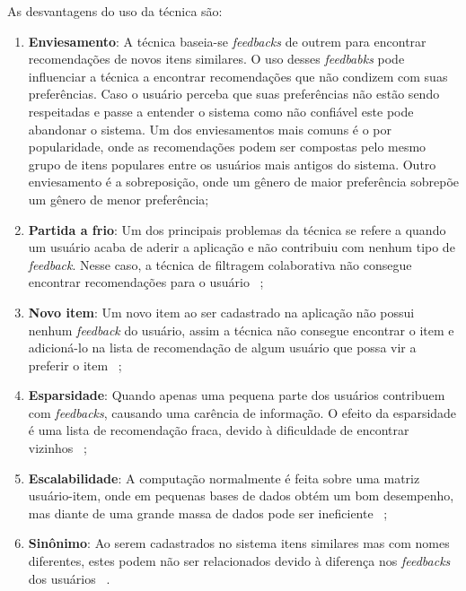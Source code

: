 As desvantagens do uso da técnica são:
\begin{enumerate}
    \item \textbf{Enviesamento}: A técnica baseia-se \textit{feedbacks} de outrem para encontrar recomendações de novos itens similares. O uso desses \textit{feedbabks} pode influenciar a técnica a encontrar recomendações que não condizem com suas preferências. Caso o usuário perceba que suas preferências não estão sendo respeitadas e passe a entender o sistema como não confiável este pode abandonar o sistema. Um dos enviesamentos mais comuns é o por popularidade, onde as recomendações podem ser compostas pelo mesmo grupo de itens populares entre os usuários mais antigos do sistema. Outro enviesamento é a sobreposição, onde um gênero de maior preferência sobrepõe um gênero de menor preferência;
    
    \item \textbf{Partida a frio}: Um dos principais problemas da técnica se refere a quando um usuário acaba de aderir a aplicação e não contribuiu com nenhum tipo de \textit{feedback}. Nesse caso, a técnica de filtragem colaborativa não consegue encontrar recomendações para o usuário~ \cite{Isinkaye:2015, Su:2009};
    
    \item \textbf{Novo item}: Um novo item ao ser cadastrado na aplicação não possui nenhum \textit{feedback} do usuário, assim a técnica não consegue encontrar o item e adicioná-lo na lista de recomendação de algum usuário que possa vir a preferir o item~ \cite{Isinkaye:2015, Su:2009};
    
    \item \textbf{Esparsidade}: Quando apenas uma pequena parte dos usuários contribuem com \textit{feedbacks}, causando uma carência de informação. O efeito da esparsidade é uma lista de recomendação fraca, devido à dificuldade de encontrar vizinhos~ \cite{Isinkaye:2015, Su:2009};
    
    \item \textbf{Escalabilidade}: A computação normalmente é feita sobre uma matriz usuário-item, onde em pequenas bases de dados obtém um bom desempenho, mas diante de uma grande massa de dados pode ser ineficiente~ \cite{Isinkaye:2015, Su:2009};
    
    \item \textbf{Sinônimo}: Ao serem cadastrados no sistema itens similares mas com nomes diferentes, estes podem não ser relacionados devido à diferença nos \textit{feedbacks} dos usuários~ \cite{Isinkaye:2015, Su:2009}.
    

\end{enumerate}
